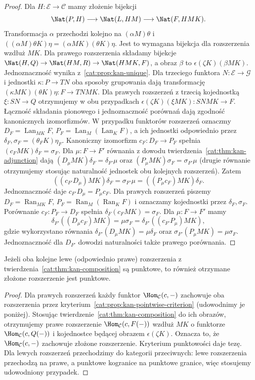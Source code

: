 \begin{proof}
Dla $H:\mathcal E\to\mathcal C$ mamy złożenie bijekcji
\[
 \Nat(P,H)\longrightarrow\Nat(L,HM)
 \longrightarrow\Nat(F,HMK).
\]
Transformacja $\alpha$ przechodzi kolejno na $(\alpha M)\theta$ i $((\alpha M)\theta K)\eta=(\alpha MK)(\theta K)\eta$. Jest to wymagana bijekcja dla rozszerzenia wzdłuż $MK$. Dla prawego rozszerzenia składamy bijekcje $\Nat(H,Q)\to\Nat(HM,R)\to\Nat(HMK,F)$, a obraz $\beta$ to $\epsilon(\zeta K)(\beta MK)$. Jednoznaczność wynika z~\ref{cat:prop:kan-unique}. Dla trzeciego funktora $N:\mathcal E\to\mathcal G$ i jednostki $\kappa:P\to TN$ oba sposoby grupowania dają transformację $(\kappa MK)(\theta K)\eta:F\to TNMK$. Dla prawych rozszerzeń z trzecią kojednostką $\xi:SN\to Q$ otrzymujemy w obu przypadkach $\epsilon(\zeta K)(\xi MK):SNMK\to F$. Łączność składania pionowego i jednoznaczność porównań dają zgodność kanonicznych izomorfizmów. W przypadku funktorów rozszerzeń oznaczmy $D_F=\operatorname{Lan}_{MK}F$, $P_F=\operatorname{Lan}_M(\operatorname{Lan}_K F)$, a ich jednostki odpowiednio przez $\delta_F,\sigma_F=(\theta_F K)\eta_F$. Kanoniczny izomorfizm $c_F:D_F\to P_F$ spełnia $(c_F MK)\delta_F=\sigma_F$. Dla $\mu:F\to F'$ równania z dowodu twierdzenia~\ref{cat:thm:kan-adjunction} dają $(D_\mu MK)\delta_F=\delta_{F'}\mu$ oraz $(P_\mu MK)\sigma_F=\sigma_{F'}\mu$ (drugie równanie otrzymujemy stosując naturalność jednostek obu kolejnych rozszerzeń). Zatem
\[
 ((c_{F'}D_\mu)MK)\delta_F=\sigma_{F'}\mu
 =((P_\mu c_F)MK)\delta_F.
\]
Jednoznaczność daje $c_{F'}D_\mu=P_\mu c_F$. Dla prawych rozszerzeń piszemy $D_F=\operatorname{Ran}_{MK}F$, $P_F=\operatorname{Ran}_M(\operatorname{Ran}_K F)$ i oznaczamy kojednostki przez $\delta_F,\sigma_F$. Porównanie $c_F:P_F\to D_F$ spełnia $\delta_F(c_F MK)=\sigma_F$. Dla $\mu:F\to F'$ mamy
\[
 \delta_{F'}((D_\mu c_F)MK)=\mu\sigma_F
 =\delta_{F'}((c_{F'}P_\mu)MK),
\]
gdzie wykorzystano równania $\delta_{F'}(D_\mu MK)=\mu\delta_F$ oraz $\sigma_{F'}(P_\mu MK)=\mu\sigma_F$. Jednoznaczność dla $D_{F'}$ dowodzi naturalności także prawego porównania.
\end{proof}
\begin{wniosek}\label{cat:cor:kan-pointwise-composition}
Jeżeli oba kolejne lewe (odpowiednio prawe) rozszerzenia z twierdzenia~\ref{cat:thm:kan-composition} są punktowe, to również otrzymane złożone rozszerzenie jest punktowe.
\end{wniosek}
\begin{proof}
Dla prawych rozszerzeń każdy funktor $\Hom_{\mathcal C}(c,-)$ zachowuje oba rozszerzenia przez kryterium~\ref{cat:prop:kan-pointwise-criterion} (udowodnimy je poniżej). Stosując twierdzenie~\ref{cat:thm:kan-composition} do ich obrazów, otrzymujemy prawe rozszerzenie $\Hom_{\mathcal C}(c,F(-))$ wzdłuż $MK$ o funktorze $\Hom_{\mathcal C}(c,Q(-))$ i kojednostce będącej obrazem $\epsilon(\zeta K)$. Oznacza to, że $\Hom_{\mathcal C}(c,-)$ zachowuje złożone rozszerzenie. Kryterium punktowości daje tezę. Dla lewych rozszerzeń przechodzimy do kategorii przeciwnych: lewe rozszerzenia przechodzą na prawe, a punktowe kogranice na punktowe granice, więc stosujemy udowodniony przypadek.
\end{proof}
